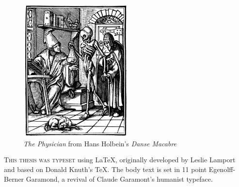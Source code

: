 \newpage

\begin{figure}
    \vspace{50pt}
    \centering
    \includegraphics[width=0.51\textwidth]{endmatter/holbein-physician.jpg}
    \\
    \emph{The Physician} from Hans Holbein's \emph{Danse Macabre}
\end{figure}


\begin{center}
\parbox{200pt}{\lettrine[lines=3,slope=-2pt,nindent=-4pt]{\textcolor{SchoolColor}{T}}{his
thesis was typeset} using \LaTeX, originally developed by Leslie Lamport and
based on Donald Knuth's \TeX. The body text is set in 11 point Egenolff-Berner
Garamond, a revival of Claude Garamont's humanist typeface. }
\end{center}
